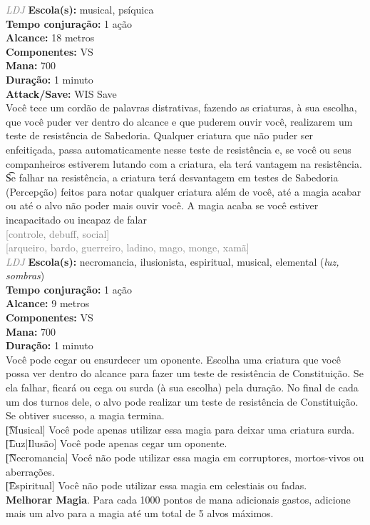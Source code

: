 \documentclass{RPG_Adventure}[2021/10/20]
\begin{document}
{\tiny \textcolor{gray}{\textit{LDJ}}}\jump{}
{\small \t \textbf{Escola(s):} musical, psíquica\\\t \textbf{Tempo conjuração:} 1 ação\\\t \textbf{Alcance:} 18 metros\\\t \textbf{Componentes:} VS\\\t \textbf{Mana:} 700\\\t \textbf{Duração:} 1 minuto\\\t \textbf{Attack/Save:} WIS Save\\}
{\normalsize Você tece um cordão de palavras distrativas, fazendo as criaturas, à sua escolha, que você puder ver dentro do alcance e que puderem ouvir você, realizarem um teste de resistência de Sabedoria. Qualquer criatura que não puder ser enfeitiçada, passa automaticamente nesse teste de resistência e, se você ou seus companheiros estiverem lutando com a criatura, ela terá vantagem na resistência.\\\t Se falhar na resistência, a criatura terá desvantagem em testes de Sabedoria (Percepção) feitos para notar qualquer criatura além de você, até a magia acabar ou até o alvo não poder mais ouvir você. A magia acaba se você estiver incapacitado ou incapaz de falar\\}
{\scriptsize \textcolor{gray}{[controle, debuff, social]\\}}
{\scriptsize \textcolor{gray}{[arqueiro, bardo, guerreiro, ladino, mago, monge, xamã]\\}}
{\tiny \textcolor{gray}{\textit{LDJ}}}\jump{}
{\small \t \textbf{Escola(s):} necromancia, ilusionista, espiritual, musical, elemental (\textit{luz, sombras})\\\t \textbf{Tempo conjuração:} 1 ação\\\t \textbf{Alcance:} 9 metros\\\t \textbf{Componentes:} VS\\\t \textbf{Mana:} 700\\\t \textbf{Duração:} 1 minuto\\}
{\normalsize Você pode cegar ou ensurdecer um oponente. Escolha uma criatura que você possa ver dentro do alcance para fazer um teste de resistência de Constituição. Se ela falhar, ficará ou cega ou surda (à sua escolha) pela duração. No final de cada um dos turnos dele, o alvo pode realizar um teste de resistência de Constituição. Se obtiver sucesso, a magia termina.\\\t [Musical] Você pode apenas utilizar essa magia para deixar uma criatura surda.\\\t [Luz|Ilusão] Você pode apenas cegar um oponente.\\\t [Necromancia] Você não pode utilizar essa magia em corruptores, mortos-vivos ou aberrações.\\\t [Espiritual] Você não pode utilizar essa magia em celestiais ou fadas.\\\t \textbf{Melhorar Magia}. Para cada 1000 pontos de mana adicionais gastos, adicione mais um alvo para a magia até um total de 5 alvos máximos.\\}
\end{document}
